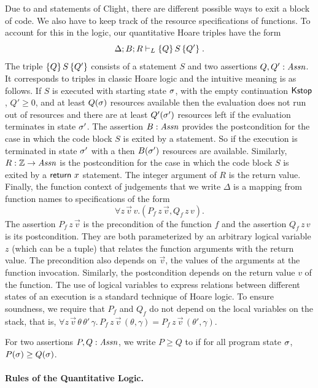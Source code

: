\documentclass[nocopyrightspace,preprint,pldi]{sigplanconf-pldi15}
\begin{document}
{Due to  and  statements of Clight, there are
different possible ways to exit a block of code.  We also have to keep
track of the resource specifications of functions.  To account for
this in the logic, our quantitative Hoare triples have the form
$$
\Delta; B; R \vdash_L
\{ Q \}\,  S \, \{ Q' \} \; .
$$
The triple $\{ Q \}\,  S \, \{ Q' \}$ consists of a statement $S$ and
two assertions $Q,Q' : \mathit{Assn}$.  It corresponds to triples in classic
Hoare logic and the intuitive meaning is as follows.  If $S$ is
executed with starting state $\sigma$, with the empty continuation
$\mathsf{Kstop}$, $Q' \ge 0$, and at least $Q(\sigma)$ resources available then the
evaluation does not run out of resources and there are at least
$Q'(\sigma')$ resources left if the evaluation terminates in state
$\sigma'$.  The assertion $B : \mathit{Assn}$ provides the
postcondition for the case in which the code block $S$ is exited by a
 statement.  So if the execution is terminated in state
$\sigma'$ with a  then $B(\sigma')$ resources are
available.  Similarly, $R : \mathbb{Z} \to \mathit{Assn}$ is the postcondition for the
case in which the code block $S$ is exited by a $\mathsf{return}~x$
statement.  The integer argument of $R$ is the return value.
Finally, the function context of judgements that we write $\Delta$ is
a mapping from function names to specifications of the form
$$
  \forall z \, \vec v \, v .(P_f \, z \, \vec v, Q_f \, z \, v).
$$
The assertion $P_f \, z \, \vec v$ is the precondition of the function
$f$ and the assertion $Q_f \, z \, v$ is its postcondition.  They are
both parameterized by an arbitrary logical variable $z$ (which can be a
tuple) that relates the function arguments with the return value.  The
precondition also depends on $\vec v$, the values of the arguments
at the function invocation.  Similarly, the postcondition depends on
the return value $v$ of the function.  The use of logical variables to
express relations between different states of an execution is a
standard technique of Hoare logic.
%
To ensure soundness, we require that $P_f$ and $Q_f$ do not depend on
the local variables on the stack, that is, $\forall z \, \vec v
\, \theta \, \theta' \, \gamma . \, P_f \, z \, \vec v \,
(\theta,\gamma) = P_f \, z \, \vec v \, (\theta',\gamma)$.

For two assertions $P,Q : \mathit{Assn}$, we write $P \ge Q$ to if for all
program state $\sigma$, $P(\sigma) \ge Q(\sigma)$.

\paragraph{Rules of the Quantitative Logic.}

}
\end{document}
